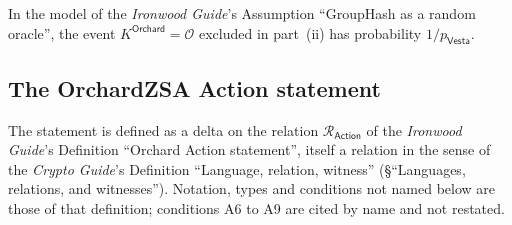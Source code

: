 \documentclass[11pt,a4paper]{article}
\theoremstyle{definition}
\newcommand{\Rel}{\mathcal{R}}
\newcommand{\Vesta}{\ensuremath{\mathsf{Vesta}}}
\begin{document}
In the model of the \emph{Ironwood Guide}'s Assumption ``GroupHash as a
random oracle'', the event $K^{\mathsf{Orchard}} = \mathcal{O}$ excluded in
part~(ii) has probability $1/p_{\Vesta}$.

\FloatBarrier
\subsection{The OrchardZSA Action statement}\label{sec:action-statement}

The statement is defined as a delta on the relation
$\Rel_{\mathsf{Action}}$ of the \emph{Ironwood Guide}'s Definition
``Orchard Action statement'', itself a relation in the sense of the
\emph{Crypto Guide}'s Definition ``Language, relation, witness''
(\S``Languages, relations, and witnesses''). Notation, types and conditions
not named below are those of that definition; conditions A6 to A9 are cited
by name and not restated.
\end{document}
